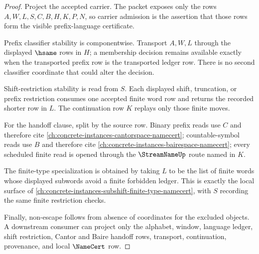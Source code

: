 \begin{proof}
Project the accepted carrier. The packet exposes only the rows $A,W,L,S,C,B,H,K,P,N$, so carrier admission is the assertion that those rows form the visible prefix-language certificate.

Prefix classifier stability is componentwise. Transport $A,W,L$ through the displayed $\hsame$ rows in $H$; a membership decision remains available exactly when the transported prefix row is the transported ledger row. There is no second classifier coordinate that could alter the decision.

Shift-restriction stability is read from $S$. Each displayed shift, truncation, or prefix restriction consumes one accepted finite word row and returns the recorded shorter row in $L$. The continuation row $K$ replays only those finite moves.

For the handoff clause, split by the source row. Binary prefix reads use $C$ and therefore cite \autoref{ch:concrete-instances-cantorspace-namecert}; countable-symbol reads use $B$ and therefore cite \autoref{ch:concrete-instances-bairespace-namecert}; every scheduled finite read is opened through the $\StreamNameUp$ route named in $K$.

The finite-type specialization is obtained by taking $L$ to be the list of finite words whose displayed subwords avoid a finite forbidden ledger. This is exactly the local surface of \autoref{ch:concrete-instances-subshift-finite-type-namecert}, with $S$ recording the same finite restriction checks.

Finally, non-escape follows from absence of coordinates for the excluded objects. A downstream consumer can project only the alphabet, window, language ledger, shift restriction, Cantor and Baire handoff rows, transport, continuation, provenance, and local $\NameCert$ row.
\end{proof}

